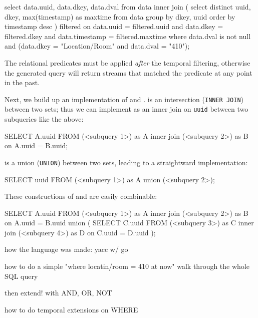 \begin{sqlcode}
select data.uuid, data.dkey, data.dval
from data
inner join
(
    select distinct uuid, dkey, max(timestamp) as maxtime 
    from data 
    group by dkey, uuid order by timestamp desc
) filtered
on 
    data.uuid = filtered.uuid 
    and data.dkey = filtered.dkey 
    and data.timestamp = filtered.maxtime
where data.dval is not null
and (data.dkey = "Location/Room" and data.dval = "410");
\end{sqlcode}

The relational predicates must be applied \emph{after} the temporal filtering,
otherwise the generated query will return streams that matched the predicate at
any point in the past.

Next, we build up an implementation of  and . 
is an intersection (\texttt{INNER JOIN}) between two sets; thus we can implement 
as an inner join on \texttt{uuid} between two subqueries like the above:

\begin{sqlcode}
SELECT A.uuid FROM
(<subquery 1>) as A
inner join
(<subquery 2>) as B
on
A.uuid = B.uuid;
\end{sqlcode}

 is a union (\texttt{UNION}) between two sets, leading to a straightward implementation:

\begin{sqlcode}
SELECT uuid FROM
(<subquery 1>) as A
union
(<subquery 2>);
\end{sqlcode}

These constructions of  and  are easily combinable:

\begin{sqlcode}

SELECT A.uuid FROM
(<subquery 1>) as A
inner join
(<subquery 2>) as B
on A.uuid = B.uuid
union
(
  SELECT C.uuid FROM
  (<subquery 3>) as C
  inner join
  (<subquery 4>) as D
  on C.uuid = D.uuid
);
\end{sqlcode}

how the language was made:
yacc w/ go

how to do a simple "where locatin/room = 410 at now"
walk through the whole SQL query

then extend! with AND, OR, NOT

how to do temporal extensions on WHERE

\fi
